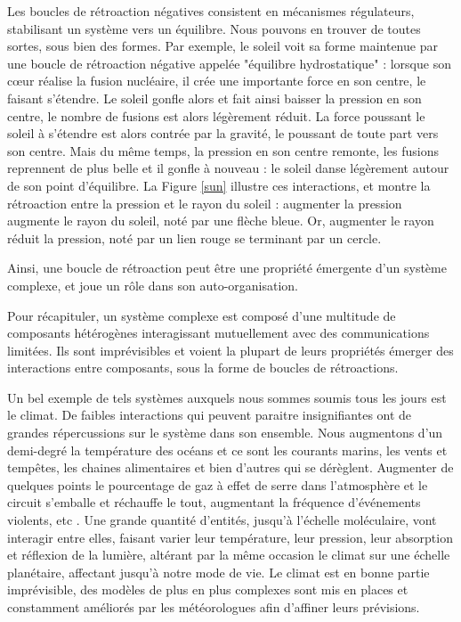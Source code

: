 		Les boucles de rétroaction négatives consistent en mécanismes régulateurs, stabilisant un système vers un équilibre. Nous pouvons en trouver de toutes sortes, sous bien des formes. Par exemple, le soleil voit sa forme maintenue par une boucle de rétroaction négative appelée "équilibre hydrostatique" \cite{haubold_analytic_1992} : lorsque son cœur réalise la fusion nucléaire, il crée une importante force en son centre, le faisant s'étendre. Le soleil gonfle alors et fait ainsi baisser la pression en son centre, le nombre de fusions est alors légèrement réduit. La force poussant le soleil à s'étendre est alors contrée par la gravité, le poussant de toute part vers son centre. Mais du même temps, la pression en son centre remonte, les fusions reprennent de plus belle et il gonfle à nouveau : le soleil danse légèrement autour de son point d'équilibre. La Figure \ref{sun} illustre ces interactions, et montre la rétroaction entre la pression et le rayon du soleil : augmenter la pression augmente le rayon du soleil, noté par une flèche bleue. Or, augmenter le rayon réduit la pression, noté par un lien rouge se terminant par un cercle.
		
		Ainsi, une boucle de rétroaction peut être une propriété émergente d'un système complexe, et joue un rôle dans son auto-organisation.
			
			Pour récapituler, un système complexe est composé d'une multitude de composants hétérogènes interagissant mutuellement avec des communications limitées. Ils sont imprévisibles et voient la plupart de leurs propriétés émerger des interactions entre composants, sous la forme de boucles de rétroactions.
			
			Un bel exemple de tels systèmes auxquels nous sommes soumis tous les jours est le climat. De faibles interactions qui peuvent paraitre insignifiantes ont de grandes répercussions sur le système dans son ensemble. Nous augmentons d'un demi-degré la température des océans et ce sont les courants marins, les vents et tempêtes, les chaines alimentaires et bien d'autres qui se dérèglent. Augmenter de quelques points le pourcentage de gaz à effet de serre dans l'atmosphère et le circuit s'emballe et réchauffe le tout, augmentant la fréquence d'événements violents, etc \cite{allen_2018_2018}. Une grande quantité d'entités, jusqu'à l'échelle moléculaire, vont interagir entre elles, faisant varier leur température, leur pression, leur absorption et réflexion de la lumière, altérant par la même occasion le climat sur une échelle planétaire, affectant jusqu'à notre mode de vie. Le climat est en bonne partie imprévisible, des modèles de plus en plus complexes sont mis en places et constamment améliorés par les météorologues afin d'affiner leurs prévisions.
						

